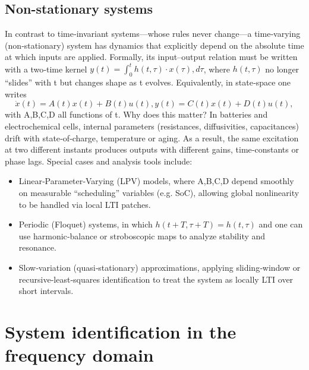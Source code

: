 \subsection{Non-stationary systems}
In contrast to time‐invariant systems—whose rules never change—a time‐varying (non‐stationary) system has dynamics that explicitly depend on the absolute time at which inputs are applied. Formally, its input–output relation must be written with a two‐time kernel $y(t)=\int _{0}^t h(t,\tau)·x(\tau),d\tau$,
where $h(t,\tau)$ no longer “slides” with t but changes shape as t evolves. Equivalently, in state‐space one writes
$$
\dot{x}(t)=A(t)x(t)+B(t)u(t),
y(t)=C(t)x(t)+D(t)u(t),
$$
with A,B,C,D all functions of t.
Why does this matter? In batteries and electrochemical cells, internal parameters (resistances, diffusivities, capacitances) drift with state‐of‐charge, temperature or aging. As a result, the same excitation at two different instants produces outputs with different gains, time‐constants or phase lags.
Special cases and analysis tools include:
\begin{itemize}
    \item Linear‐Parameter‐Varying (LPV) models, where A,B,C,D depend smoothly on measurable “scheduling” variables (e.g. SoC), allowing global nonlinearity to be handled via local LTI patches.
    \item Periodic (Floquet) systems, in which $h(t+T,\tau+T)=h(t,\tau)$ and one can use harmonic‐balance or stroboscopic maps to analyze stability and resonance.
    \item Slow‐variation (quasi‐stationary) approximations, applying sliding‐window or recursive‐least‐squares identification to treat the system as locally LTI over short intervals.
\end{itemize}

\section{System identification in the frequency domain}
